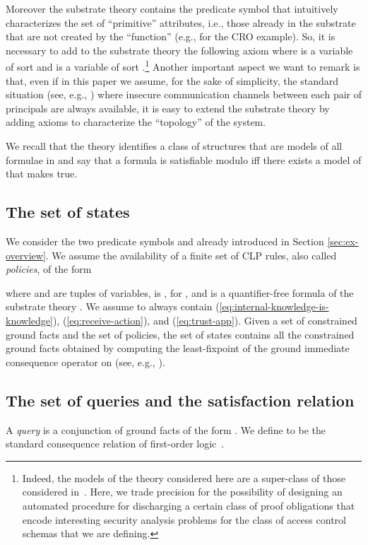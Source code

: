 \documentclass[conference]{llncs}
\newcommand{\CRO}{CRO}
\begin{document}
Moreover the substrate theory  contains the
predicate symbol  
that intuitively characterizes the set of ``primitive'' attributes, i.e., those already in the substrate that are not created by the ``function''  (e.g.,  for the \CRO{} example).
So, it is necessary to add to the substrate theory the  following axiom  where  is a variable of
sort  and  is a variable of sort
.\footnote{Indeed, the models of the theory considered here
are a super-class of those considered in~\cite{GurevichNeeman-dkal}.
Here, we trade precision for the possibility of designing an automated
procedure for discharging a certain class of proof obligations that
encode interesting security analysis problems for the class of access
control schemas that we are defining.} 
Another important aspect we want to remark is that, even if in this paper we assume, for the sake of simplicity,
the standard situation (see, e.g., \cite{MauSch96}) where insecure communication channels
between each pair of principals are always available, it is easy to extend the substrate theory
by adding axioms to characterize the ``topology'' of the system. 

We recall that the theory
 identifies a class of structures that are models of
all formulae in  and say that a formula  is
satisfiable modulo  iff there exists a model of
 that makes  true.

\subsection{The set  of states} 
\label{subsec:setofstates}
We consider the two predicate symbols
 and  already introduced in Section \ref{sec:ex-overview}. 
We assume the availability of a finite set  of CLP rules, also called
\emph{policies}, of the form


where  and  are tuples of variables,
 is ,  for , and
 is a quantifier-free formula of the substrate theory
.  We assume  to always contain
(\ref{eq:internal-knowledge-is-knowledge}), (\ref{eq:receive-action}),
and (\ref{eq:trust-app}).  Given a set  of constrained ground facts
and the set  of policies, the set  of states contains
all the constrained ground facts obtained by computing the
least-fixpoint  of the ground
immediate consequence operator on  (see,
e.g., \cite{constraintdatalog}).

\subsection{The set  of queries and the satisfaction relation }
\label{subsec:setofqueries}
A \emph{query} is a conjunction of ground facts of the form
. We define  to be the
standard consequence relation  of first-order
logic~\cite{enderton}.
\end{document}
